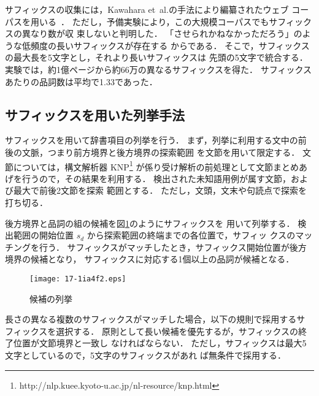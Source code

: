 \documentclass[japanese]{jnlp_1.4}
\begin{document}
サフィックスの収集には，Kawahara et~al.の手法により編纂されたウェブ
コーパスを用いる~\cite{Kawahara2006full}．
ただし，予備実験により，この大規模コーパスでもサフィックスの異なり数が収
束しないと判明した．
「させられかねなかっただろう」のような低頻度の長いサフィックスが存在する
からである．
そこで，サフィックスの最大長を5文字とし，それより長いサフィックスは
先頭の5文字で統合する．
実験では，約1億ページから約66万の異なるサフィックスを得た．
サフィックスあたりの品詞数は平均で1.33であった．


\subsection{サフィックスを用いた列挙手法} \label{sec:enumeration-method}

サフィックスを用いて辞書項目の列挙を行う．
まず，列挙に利用する文中の前後の文脈，つまり前方境界と後方境界の探索範囲
を文節を用いて限定する．
\pagebreak
文節については，構文解析器
    KNP\footnote{http://nlp.kuee.kyoto-u.ac.jp/nl-resource/knp.html}
が係り受け解析の前処理として文節まとめあげを行うので，その結果を利用する．
検出された未知語用例が属す文節，および最大で前後2文節を探索
範囲とする．
ただし，文頭，文末や句読点で探索を打ち切る．

後方境界と品詞の組の候補を図\ref{fig:suffix-match}のようにサフィックスを
用いて列挙する．
検出範囲の開始位置 $s_d$ から探索範囲の終端までの各位置で，サフィッ
クスのマッチングを行う．
サフィックスがマッチしたとき，サフィックス開始位置が後方境界の候補となり，
サフィックスに対応する1個以上の品詞が候補となる．

\begin{figure}[b]
\begin{center}
\texttt{[image: 17-1ia4f2.eps]}
\end{center}
 \caption{候補の列挙}
 \label{fig:suffix-match}
\end{figure}

長さの異なる複数のサフィックスがマッチした場合，以下の規則で採用するサ
フィックスを選択する．
原則として長い候補を優先するが，サフィックスの終了位置が文節境界と一致し
なければならない．
ただし，サフィックスは最大5文字としているので，5文字のサフィックスがあれ
ば無条件で採用する．
\end{document}
